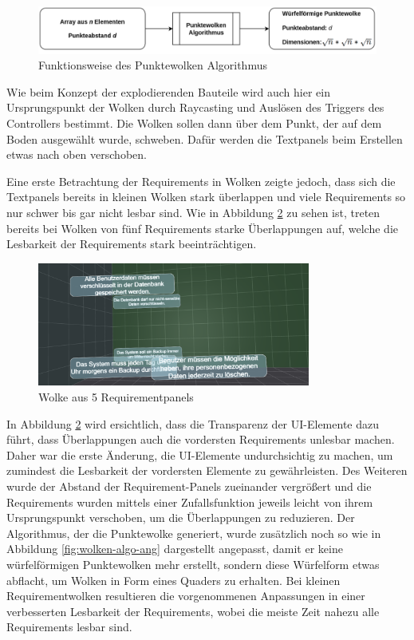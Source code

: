 \begin{figure}[H]
    \centering
    \includegraphics[width=1\textwidth]{images/WolkenAlgo.png}
    \caption{Funktionsweise des Punktewolken Algorithmus}
    \label{fig:wolken-algo}
\end{figure}


Wie beim Konzept der explodierenden Bauteile wird auch hier ein Ursprungspunkt der Wolken durch Raycasting und Auslösen des Triggers des Controllers bestimmt.
Die Wolken sollen dann über dem Punkt, der auf dem Boden ausgewählt wurde, schweben.
Dafür werden die Textpanels beim Erstellen etwas nach oben verschoben.

\newpage

Eine erste Betrachtung der Requirements in Wolken zeigte jedoch, dass sich die Textpanels bereits in kleinen Wolken stark überlappen und viele Requirements so nur schwer bis gar nicht lesbar sind.
Wie in Abbildung \ref{fig:wolken-prototyp} zu sehen ist, treten bereits bei Wolken von fünf Requirements starke Überlappungen auf, welche die Lesbarkeit der Requirements stark beeinträchtigen.

\begin{figure}[H]
    \centering
    \includegraphics[width=0.8\textwidth]{images/WolkenPrototyp.png}
    \caption{Wolke aus 5 Requirementpanels}
    \label{fig:wolken-prototyp}
\end{figure}

In Abbildung \ref{fig:wolken-prototyp} wird ersichtlich, dass die Transparenz der UI-Elemente dazu führt, dass Überlappungen auch die vordersten Requirements unlesbar machen.
Daher war die erste Änderung, die UI-Elemente undurchsichtig zu machen, um zumindest die Lesbarkeit der vordersten Elemente zu gewährleisten.
Des Weiteren wurde der Abstand der Requirement-Panels zueinander vergrößert und die Requirements wurden mittels einer Zufallsfunktion jeweils leicht von ihrem Ursprungspunkt verschoben, um die Überlappungen zu reduzieren.
Der Algorithmus, der die Punktewolke generiert, wurde zusätzlich noch so wie in Abbildung \ref{fig:wolken-algo-ang} dargestellt angepasst, damit er keine würfelförmigen Punktewolken mehr erstellt, sondern diese Würfelform etwas abflacht, um Wolken in Form eines Quaders zu erhalten.
Bei kleinen Requirementwolken resultieren die vorgenommenen Anpassungen in einer verbesserten Lesbarkeit der Requirements, wobei die meiste Zeit nahezu alle Requirements lesbar sind.

